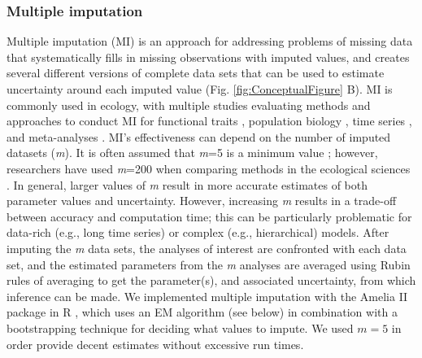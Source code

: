 \documentclass{article}
\begin{document}
\begin{linenumbers}
\subsubsection*{Multiple imputation}

Multiple imputation (MI) is an approach for addressing problems of missing data that systematically fills in missing observations with imputed values, and creates several different versions of complete data sets that can be used to estimate uncertainty around each imputed value (Fig. \ref{fig:ConceptualFigure} B). MI is commonly used in ecology, with multiple studies evaluating methods and approaches to conduct MI for functional traits \citep{taugourdeau_filling_2014,johnson_handling_2021,penone_imputation_2014}, population biology \citep{onkelinx_working_2017}, time series \citep{hui_gap-filling_2004}, and meta-analyses \citep{ellington_using_2015}.  MI’s effectiveness can depend on the number of imputed datasets (\textit{m}). It is often assumed that \textit{m}=5 is a minimum value \citep{honaker_what_2010}; however, researchers have used \textit{m}=200 when comparing methods in the ecological sciences \citep{onkelinx_working_2017}. In general, larger values of \textit{m} result in more accurate estimates of both parameter values and uncertainty. However, increasing \textit{m} results in a trade-off between accuracy and computation time; this can be particularly problematic for data-rich (e.g., long time series) or complex (e.g., hierarchical) models. After imputing the \textit{m} data sets, the analyses of interest are confronted with each data set, and the estimated parameters from the \textit{m} analyses are averaged using Rubin rules of averaging to get the parameter(s), and associated uncertainty, from which inference can be made. We implemented multiple imputation with the Amelia II package in R \citep{honaker2011}, which uses an EM algorithm (see below) in combination with a bootstrapping technique for deciding what values to impute. We used $m=5$ in order provide decent estimates without excessive run times.


\end{linenumbers}
\end{document}
